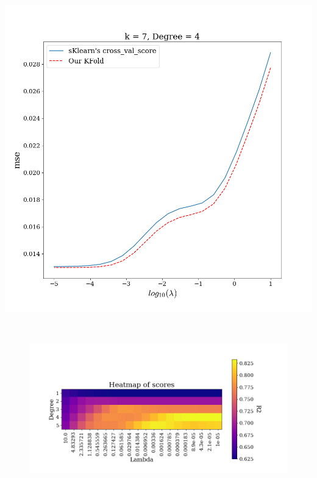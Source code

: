 \documentclass[twoside,11pt]{report}
\begin{document}
\begin{minipage}[!t]{.48\linewidth}

\end{minipage}
\hspace{4mm}
\begin{minipage}[!t]{.48\linewidth}
    \begin{center}
        \includegraphics[width=1.0\textwidth]{../runsAndAdditions/crossvalOursVsSklearn.png}
    \end{center}
\end{minipage}\\
\begin{figure}
    \begin{center}
        \includegraphics[width=1.0\textwidth]{../runsAndAdditions/heatmapCrossval.png}
    \end{center}
    \caption{}\label{fig:}
\end{figure}
\end{document}
